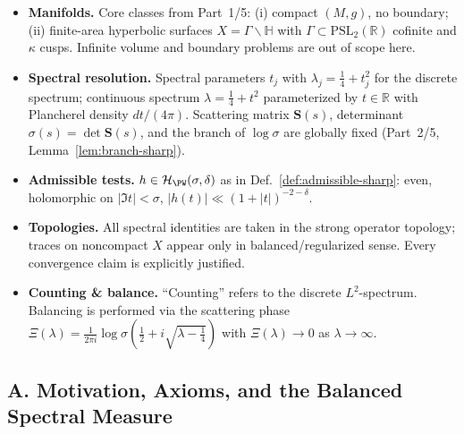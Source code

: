 \begin{tcolorbox}[colback=gray!5,colframe=gray!35,
  title=Scope \& Assumptions (ZNB-9+++ • MEA-Core-SS • enforced)]
\begin{itemize}
  \item \textbf{Manifolds.} Core classes from Part~1/5: (i) compact $(M,g)$, no boundary; (ii) finite-area hyperbolic surfaces $X=\Gamma\backslash\mathbb H$ with $\Gamma\subset\mathrm{PSL}_2(\mathbb R)$ cofinite and $\kappa$ cusps. Infinite volume and boundary problems are out of scope here.
  \item \textbf{Spectral resolution.} Spectral parameters $t_j$ with $\lambda_j=\tfrac14+t_j^2$ for the discrete spectrum; continuous spectrum $\lambda=\tfrac14+t^2$ parameterized by $t\in\mathbb R$ with Plancherel density $dt/(4\pi)$. Scattering matrix $\mathbf S(s)$, determinant $\sigma(s)=\det \mathbf S(s)$, and the branch of $\log\sigma$ are globally fixed (Part~2/5, Lemma~\ref{lem:branch-sharp}).
  \item \textbf{Admissible tests.} $h\in\mathcal H_{\PW}(\sigma,\delta)$ as in Def.~\ref{def:admissible-sharp}: even, holomorphic on $|\Im t|<\sigma$, $|h(t)|\ll (1+|t|)^{-2-\delta}$.
  \item \textbf{Topologies.} All spectral identities are taken in the strong operator topology; traces on noncompact $X$ appear only in balanced/regularized sense. Every convergence claim is explicitly justified.
  \item \textbf{Counting \& balance.} ``Counting'' refers to the discrete $L^2$-spectrum. Balancing is performed via the scattering phase $\Xi(\lambda)=\frac{1}{2\pi i}\log\sigma\!\left(\tfrac12+i\sqrt{\lambda-\tfrac14}\right)$ with $\Xi(\lambda)\to0$ as $\lambda\to\infty$.
\end{itemize}
\end{tcolorbox}

\subsection*{A. Motivation, Axioms, and the Balanced Spectral Measure}
\label{subsec:axioms}

